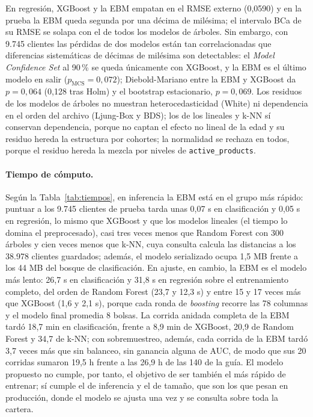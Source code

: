 \documentclass[pdflatex,sn-mathphys-num]{sn-jnl}
\newcommand{\ap}{\texttt{active\_products}}
\begin{document}
En regresión, XGBoost y la EBM empatan en el RMSE externo (0,0590) y en la prueba la EBM queda segunda por una décima de milésima; el intervalo BCa de su RMSE se solapa con el de todos los modelos de árboles. Sin embargo, con 9.745 clientes las pérdidas de dos modelos están tan correlacionadas que diferencias sistemáticas de décimas de milésima son detectables: el \textit{Model Confidence Set} al 90\,\% se queda únicamente con XGBoost, y la EBM es el último modelo en salir ($p_{\mathrm{MCS}}=0{,}072$); Diebold-Mariano entre la EBM y XGBoost da $p=0{,}064$ (0,128 tras Holm) y el bootstrap estacionario, $p=0{,}069$. Los residuos de los modelos de árboles no muestran heterocedasticidad (White) ni dependencia en el orden del archivo (Ljung-Box y BDS); los de los lineales y k-NN sí conservan dependencia, porque no captan el efecto no lineal de la edad y su residuo hereda la estructura por cohortes; la normalidad se rechaza en todos, porque el residuo hereda la mezcla por niveles de \ap.

\paragraph{Tiempo de cómputo.}
Según la Tabla~\ref{tab:tiempos}, en inferencia la EBM está en el grupo más rápido: puntuar a los 9.745 clientes de prueba tarda unas 0,07 s en clasificación y 0,05 s en regresión, lo mismo que XGBoost y que los modelos lineales (el tiempo lo domina el preprocesado), casi tres veces menos que Random Forest con 300 árboles y cien veces menos que k-NN, cuya consulta calcula las distancias a los 38.978 clientes guardados; además, el modelo serializado ocupa 1,5 MB frente a los 44 MB del bosque de clasificación. En ajuste, en cambio, la EBM es el modelo más lento: 26,7 s en clasificación y 31,8 s en regresión sobre el entrenamiento completo, del orden de Random Forest (23,7 y 12,3 s) y entre 15 y 17 veces más que XGBoost (1,6 y 2,1 s), porque cada ronda de \textit{boosting} recorre las 78 columnas y el modelo final promedia 8 bolsas. La corrida anidada completa de la EBM tardó 18,7 min en clasificación, frente a 8,9 min de XGBoost, 20,9 de Random Forest y 34,7 de k-NN; con sobremuestreo, además, cada corrida de la EBM tardó 3,7 veces más que sin balanceo, sin ganancia alguna de AUC, de modo que sus 20 corridas sumaron 19,5 h frente a las 26,9 h de las 140 de la guía. El modelo propuesto no cumple, por tanto, el objetivo de ser también el más rápido de entrenar; sí cumple el de inferencia y el de tamaño, que son los que pesan en producción, donde el modelo se ajusta una vez y se consulta sobre toda la cartera.
\end{document}
